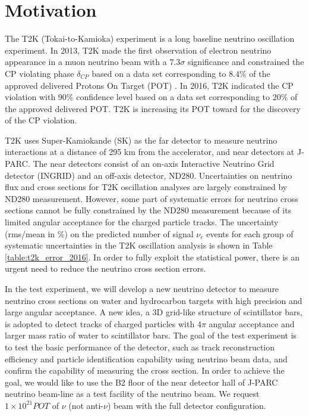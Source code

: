 \section{Motivation}
The T2K (Tokai-to-Kamioka) experiment is a long baseline neutrino oscillation experiment.
In 2013, T2K made the first observation of electron neutrino appearance in a muon neutrino beam
with a $7.3\sigma$ significance and constrained the CP violating phase $\delta_{CP}$ based on
a data set corresponding to $8.4\%$ of the approved delivered Protons On Target (POT) \cite{t2k_nue_appearance_2013}.
In 2016, T2K indicated the CP violation with $90\%$ confidence level based on
a data set corresponding to $20\%$ of the approved delivered POT\cite{t2k_cp_2016}.
T2K is increasing its POT toward for the discovery of the CP violation.


T2K uses Super-Kamiokande (SK) as the far detector to measure neutrino interactions
at a distance of 295 km from the accelerator, and near detectors at J-PARC.
The near detectors consist of an on-axis Interactive Neutrino Grid detector (INGRID)
and an off-axis detector, ND280.
Uncertainties on neutrino flux and cross sections for T2K oscillation analyses are largely constrained
by ND280 measurement.
However, some part of systematic errors for neutrino cross sections cannot be fully constrained by the ND280 measurement because of its limited angular acceptance for the charged particle tracks.
The uncertainty (rms/mean in \%) on the predicted number of signal $\nu_{e}$ events for each group
of systematic uncertainties in the T2K oscillation analysis \cite{t2K_cp_2016} is shown in Table \ref{table:t2k_error_2016}.
In order to fully exploit the statistical power, there is an urgent need to reduce the neutrino cross section errors.


In the test experiment, we will develop a new neutrino detector to measure neutrino cross sections
on water and hydrocarbon targets with high precision and large angular acceptance.
A new idea, a 3D grid-like structure of scintillator bars, is adopted to detect tracks of charged particles
with $4\pi$ angular acceptance and larger mass ratio of water to scintillator bars.
The goal of the test experiment is to test the basic performance of the detector,
such as track reconstruction efficiency and particle identification capability using neutrino beam data,
and confirm the capability of measuring the cross section.
In order to achieve the goal, we would like to use the B2 floor of the near detector hall of J-PARC neutrino beam-line as a test facility of the neutrino beam.
We request $1 \times 10^{21} POT$ of $\nu$ (not anti-$\nu$) beam with the full detector configuration.
